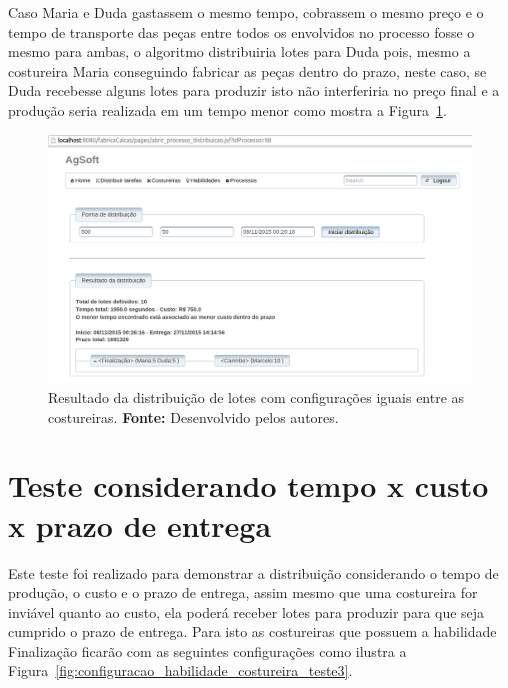 \par Caso Maria e Duda gastassem o mesmo tempo, cobrassem o mesmo preço e o tempo de
transporte das peças entre todos os envolvidos no processo fosse o mesmo para ambas, 
o algoritmo distribuiria lotes para Duda pois, mesmo a costureira Maria
conseguindo fabricar as peças dentro do prazo, neste caso, se Duda recebesse alguns lotes para produzir
isto não interferiria no preço final e a produção seria realizada em um tempo menor como mostra a Figura~\ref{fig:resultado_tudo_igual}.



\begin{figure}[h!]
	\centerline{\includegraphics[scale=0.3]{./imagens/resultado_tudo_igual_teste2.png}}
	\caption[Resultado da distribuição de lotes com configurações iguais entre as
	costureiras.] 
	{Resultado da distribuição de lotes com configurações iguais entre as
	costureiras. \textbf{Fonte:}
	Desenvolvido pelos autores.}
	\label{fig:resultado_tudo_igual}
\end{figure}

\section{Teste considerando tempo x custo x prazo de entrega}

\par Este teste foi realizado para demonstrar a distribuição considerando o tempo de
produção, o custo e o prazo de entrega, assim mesmo que uma costureira for inviável 
quanto ao custo, ela poderá receber lotes para produzir para que seja cumprido o prazo 
de entrega. Para isto as costureiras que possuem a habilidade Finalização ficarão com
as seguintes configurações como ilustra a Figura~\ref{fig:configuracao_habilidade_costureira_teste3}.

